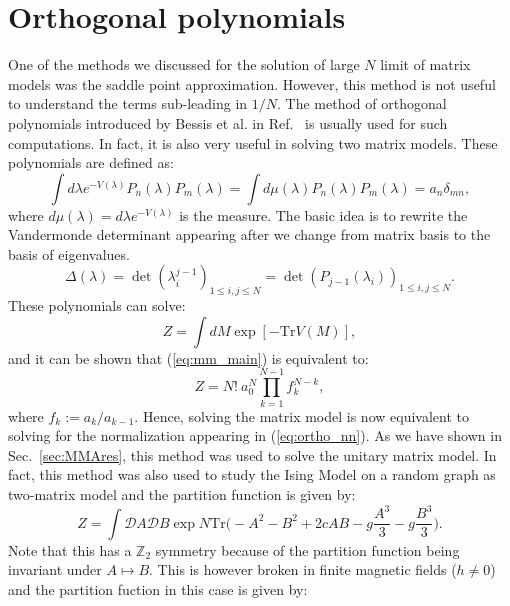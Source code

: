 \documentclass[letter,11pt]{article}
\begin{document}
\section{\label{sec:Ortho_pol1}Orthogonal polynomials}
One of the methods we discussed for the solution of 
large $N$ limit of matrix models was the saddle point approximation. 
However, this method is not useful 
to understand the terms sub-leading in $1/N$. The method 
of orthogonal polynomials introduced by Bessis et al. in Ref.~\cite{Bessis:1980ss} 
is usually used for such computations. In fact, it is also very useful in 
solving two matrix 
models. These polynomials are defined as:
\begin{equation}
	\label{eq:ortho_nn} 
	\int d\lambda e^{-V(\lambda)} P_{n}(\lambda)
	P_{m}(\lambda) = \int d \mu(\lambda) P_{n}(\lambda)
	P_{m}(\lambda) = a_{n} \delta_{mn} ,
\end{equation}
where $d \mu(\lambda) = d\lambda e^{-V(\lambda)}$ is the measure. 
The basic idea is to rewrite the Vandermonde determinant appearing after we change from matrix basis to the basis of eigenvalues. 
\begin{equation}
	\Delta(\lambda) = \det(\lambda_{i}^{j-1})_{1 \le i, j \le N} = \det(P_{j-1}(\lambda_i))_{1 \le i, j \le N}. 
\end{equation}
These polynomials can solve:
\begin{equation}
	\label{eq:mm_main}
	Z = \int dM \exp[-\mbox{Tr} V(M)] ,
\end{equation}
and it can be shown that (\ref{eq:mm_main}) is equivalent to:
\begin{equation}
\label{eq:ZOP} 
	Z = N! ~ a_{0}^{N} \prod_{k=1}^{N-1} f_{k}^{N-k},
\end{equation}
where $f_{k} := a_{k}/a_{k-1}$. Hence, solving the matrix model is now equivalent to solving for the 
normalization appearing in (\ref{eq:ortho_nn}). As we have shown in Sec.~\ref{sec:MMAres}, 
this method was used to solve the unitary 
matrix model. In fact, this method was also used to study the Ising Model on a random graph as two-matrix model 
\cite{Kazakov:1986hu}
and the partition function is given by:
\begin{equation}
	\label{eq:Kaz1} 
	Z = \int \mathcal{D}A \mathcal{D}B \exp N \mbox{Tr} \Bigg(-A^2 -B^2 + 2c AB -g \frac{A^3}{3} - g\frac{B^3}{3}  \Bigg). 
\end{equation}
Note that this has a $\mathbb{Z}_{2}$ symmetry because of 
the partition function being invariant under $A \mapsto B$. This is however broken in finite magnetic fields ($h \neq 0$) and the partition fuction in this case is given by:
\end{document}
